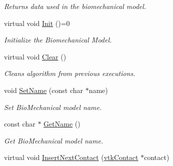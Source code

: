 \begin{DoxyCompactItemize}
\begin{DoxyCompactList}\small\item\em Returns data used in the biomechanical model. \item\end{DoxyCompactList}\item 
\hypertarget{classvtkBioMechanicalModel_a9f1e1d9704e92272d237cfb79bfa0c97}{
virtual void \hyperlink{classvtkBioMechanicalModel_a9f1e1d9704e92272d237cfb79bfa0c97}{Init} ()=0}
\label{classvtkBioMechanicalModel_a9f1e1d9704e92272d237cfb79bfa0c97}

\begin{DoxyCompactList}\small\item\em Initialize the Biomechanical Model. \item\end{DoxyCompactList}\item 
\hypertarget{classvtkBioMechanicalModel_a4030145604846601b466b1b460121467}{
virtual void \hyperlink{classvtkBioMechanicalModel_a4030145604846601b466b1b460121467}{Clear} ()}
\label{classvtkBioMechanicalModel_a4030145604846601b466b1b460121467}

\begin{DoxyCompactList}\small\item\em Cleans algorithm from previous executions. \item\end{DoxyCompactList}\item 
\hypertarget{classvtkBioMechanicalModel_aaaba67cef144b685b570f04824c1afef}{
void \hyperlink{classvtkBioMechanicalModel_aaaba67cef144b685b570f04824c1afef}{SetName} (const char $\ast$name)}
\label{classvtkBioMechanicalModel_aaaba67cef144b685b570f04824c1afef}

\begin{DoxyCompactList}\small\item\em Set BioMechanical model name. \item\end{DoxyCompactList}\item 
\hypertarget{classvtkBioMechanicalModel_a5bf40a4f9f51ce7863fff6471fd1b679}{
const char $\ast$ \hyperlink{classvtkBioMechanicalModel_a5bf40a4f9f51ce7863fff6471fd1b679}{GetName} ()}
\label{classvtkBioMechanicalModel_a5bf40a4f9f51ce7863fff6471fd1b679}

\begin{DoxyCompactList}\small\item\em Get BioMechanical model name. \item\end{DoxyCompactList}\item 
\hypertarget{classvtkBioMechanicalModel_a179b870e005db07779090962ca4bf39b}{
virtual void \hyperlink{classvtkBioMechanicalModel_a179b870e005db07779090962ca4bf39b}{InsertNextContact} (\hyperlink{classvtkContact}{vtkContact} $\ast$contact)}
\label{classvtkBioMechanicalModel_a179b870e005db07779090962ca4bf39b}


\end{DoxyCompactItemize}
